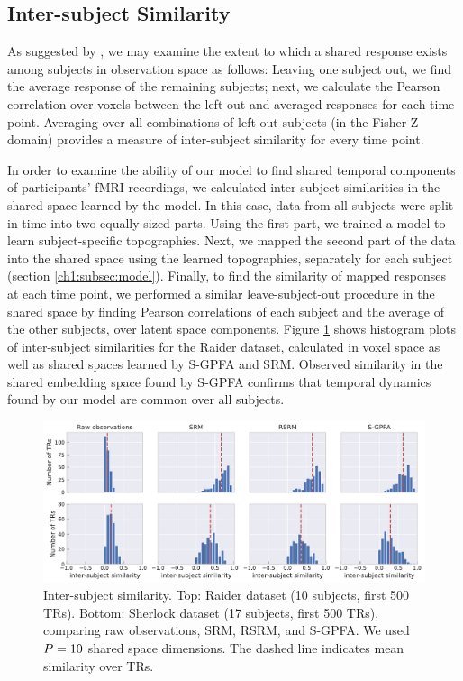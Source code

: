 \subsection{Inter-subject Similarity}

As suggested by \cite{srm}, we may examine the extent to which a shared response exists among subjects in observation space as follows: Leaving one subject out, we find the average response of the remaining subjects; next, we calculate the Pearson correlation over voxels between the left-out and averaged responses for each time point. Averaging over all combinations of left-out subjects (in the Fisher Z domain) provides a measure of inter-subject similarity for every time point.

In order to examine the ability of our model to find shared temporal components of participants' fMRI recordings, we calculated inter-subject similarities in the shared space learned by the model. In this case, data from all subjects were split in time into two equally-sized parts. Using the first part, we trained a model to learn subject-specific topographies. Next, we mapped the second part of the data into the shared space using the learned topographies, separately for each subject (section \ref{ch1:subsec:model}). Finally, to find the similarity of mapped responses at each time point, we performed a similar leave-subject-out procedure in the shared space by finding Pearson correlations of each subject and the average of the other subjects, over latent space components. Figure \ref{ch1:fig:isc} shows histogram plots of inter-subject similarities for the Raider dataset, calculated in voxel space as well as shared spaces learned by S-GPFA and SRM. Observed similarity in the shared embedding space found by S-GPFA confirms that temporal dynamics found by our model are common over all subjects.

\begin{figure}[h]
    \centering
    \includegraphics[width=\linewidth]{figs/ch1/isc_3.pdf}
    \caption{Inter-subject similarity. Top: Raider dataset (10 subjects, first 500 TRs). Bottom: Sherlock dataset (17 subjects, first 500 TRs), comparing raw observations, SRM, RSRM, and S-GPFA. We used $P=10$ shared space dimensions. The dashed line indicates mean similarity over TRs.}\label{ch1:fig:isc}
\end{figure}

